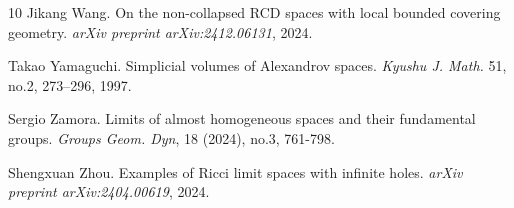\documentclass[12pt]{amsart}
\theoremstyle{definition}
\numberwithin{equation}{section}
\begin{document}
\begin{thebibliography}{10}
Jikang Wang.
\newblock On the non-collapsed RCD spaces with local bounded covering geometry. {\em arXiv preprint  arXiv:2412.06131}, 2024.

Takao Yamaguchi. 
\newblock Simplicial volumes of Alexandrov spaces. {\em  Kyushu J. Math. }51, no.2, 273–296, 1997.

Sergio Zamora. 
\newblock Limits of almost homogeneous spaces and their fundamental groups. {\em Groups Geom. Dyn}, 18 (2024), no.3, 761-798.

Shengxuan Zhou. 
\newblock Examples of Ricci limit spaces with infinite holes. {\em arXiv preprint arXiv:2404.00619}, 2024.

\end{thebibliography}


%
%
\end{document}
